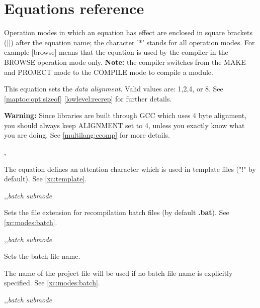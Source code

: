 \section{Equations reference}\label{opt:equ:list}

Operation  modes in  which  an  equation has effect are
enclosed in square brackets  ([])  after  the equation name; the
character '*' stands  for  all  operation  modes.  For  example
[browse]  means  that  the  equation is used by the compiler in the
BROWSE  operation mode only. {\bf Note:} the compiler switches from
the MAKE and PROJECT mode to the COMPILE mode to compile a module.

\ifonline \else
\begin{description}
\fi

        \MLBegin{}\ModeC{}\MLEnd{} \inline

        This equation sets the {\em data alignment}. Valid values are:
        1,2,4, or 8. See
        \ifgenc \ref{maptoc:opt:sizeof} \fi
        \ifgencode \ref{lowlevel:recrep} \fi
        for further details.

        \ifgencode
          \iflinux
            {\bf Warning:} Since \XDS{} libraries are built through GCC which
            uses 4 byte alignment, you should always keep ALIGNMENT set to 4,
            unless you exactly know what you are doing.
            See \ref{multilang:ccomp} for more details.
          \fi
        \fi

        \MLBegin{}\ModeP{},\ModeG{}\MLEnd{}

        The equation defines an attention character which is used
        in template files ("!" by default).
        See \ref{xc:template}.

        \MLBegin{}\ModeM{},\ModeP{},{\em batch submode}\MLEnd{}

        Sets the file extension for recompilation
        batch files (by default {\bf .bat}).
        See \ref{xc:modes:batch}.

        \MLBegin{}\ModeM{},\ModeP{},{\em batch submode}\MLEnd{}

        Sets the batch file name.

        The name of the project file will be used if no batch file  name
        is explicitly specified.
        See \ref{xc:modes:batch}.

        \MLBegin{}\ModeM{},\ModeP{},{\em batch submode}\MLEnd{}


\end{description}
